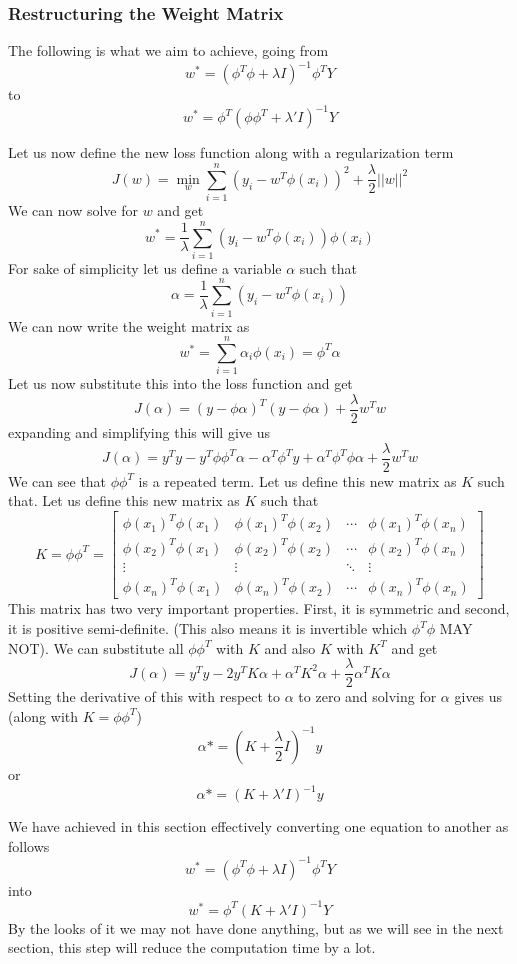 \documentclass[hidelinks]{book}
\numberwithin{equation}{section}
\begin{document}
  \subsubsection{Restructuring the Weight Matrix}
  The following is what we aim to achieve, going from
  $$w^* =(\phi^T \phi + \lambda I)^{-1} \phi^T Y $$
  to
  $$w^* = \phi^T (\phi \phi^T + \lambda' I)^{-1} Y $$

  Let us now define the new loss function along with a regularization term
  $$ J(w) = \min_w \sum_{i=1}^n (y_i - w^T \phi(x_i))^2 + \frac{\lambda}{2} ||w||^2 $$ We can now solve for $w$ and get
  $$ w^* = \frac{1}{\lambda} \sum_{i=1}^n (y_i - w^T \phi(x_i)) \phi(x_i) $$ For sake of simplicity let us define a variable $\alpha$ such that
  $$ \alpha = \frac{1}{\lambda} \sum_{i=1}^n (y_i - w^T \phi(x_i)) $$ We can now write the weight matrix as
  $$ w^* = \sum_{i=1}^n \alpha_i \phi(x_i) = \phi^T \alpha $$ Let us now substitute this into the loss function and get
  $$ J(\alpha) = (y - \phi \alpha)^T (y - \phi \alpha) + \frac{\lambda}{2} w^T w $$ expanding and simplifying this will give us
  $$ J(\alpha) = y^T y - y^T \phi \phi^T \alpha - \alpha^T \phi^T y + \alpha^T \phi^T \phi \alpha + \frac{\lambda}{2} w^T w $$ We can see that $\phi \phi^T$ is a repeated term. Let us define this new matrix as $K$ such that. Let us define this new matrix as $K$ such that
  $$ K = \phi \phi^T = \begin{bmatrix}
  \phi(x_1)^T \phi(x_1) & \phi(x_1)^T \phi(x_2) & \cdots & \phi(x_1)^T \phi(x_n) \\
  \phi(x_2)^T \phi(x_1) & \phi(x_2)^T \phi(x_2) & \cdots & \phi(x_2)^T \phi(x_n) \\
  \vdots & \vdots & \ddots & \vdots \\
  \phi(x_n)^T \phi(x_1) & \phi(x_n)^T \phi(x_2) & \cdots & \phi(x_n)^T \phi(x_n) \end{bmatrix} $$ This matrix has two very important properties. First, it is symmetric and second, it is positive semi-definite. (This also means it is invertible which $\phi^T \phi$ MAY NOT). We can substitute all $\phi \phi^T$ with $K$ and also $K$ with $K^T$ and get
  $$ J(\alpha) = y^T y - 2 y^T K \alpha + \alpha^T K^2 \alpha + \frac{\lambda}{2} \alpha^T K \alpha $$
  Setting the derivative of this with respect to $\alpha$
  to zero and solving for $\alpha$ gives us (along with $K = \phi \phi^T$)
  $$ \alpha* = (K + \frac{\lambda}{2} I)^{-1} y $$ or $$ \alpha* = (K+ \lambda' I)^{-1} y $$

  We have achieved in this section effectively converting
  one equation to another as follows
  $$ w^* = (\phi^T \phi + \lambda I)^{-1} \phi^T Y $$ into
  $$ w^* = \phi^T (K + \lambda' I)^{-1} Y $$ By the looks of it we may not have
  done anything, but as we will see in the next section, this step will reduce
  the computation time by a lot.
\end{document}
